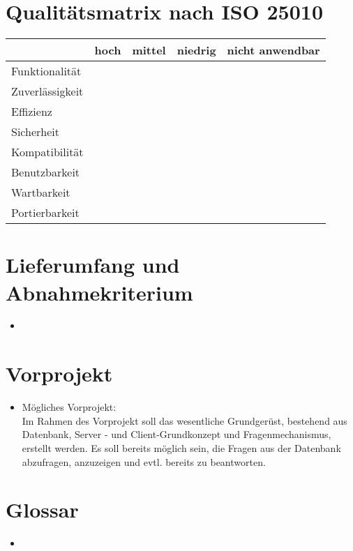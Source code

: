 \documentclass[11pt,a4paper]{scrreprt}
\begin{document}
\chapter{Qualitätsmatrix nach ISO 25010}
\begin{tabular}{|l|c|c|c|c|}
\hline
		& hoch & mittel & niedrig& nicht anwendbar\\
\hline
Funktionalität  &              &              & 		&\\     
Zuverlässigkeit	&              &              & 		&\\
Effizienz 		&              &              & 		&\\
Sicherheit  	&              &              & 		&\\
Kompatibilität  &              &              & 		&\\
Benutzbarkeit  	&              &              & 		&\\
Wartbarkeit  	&              &              & 		&\\
Portierbarkeit  &              &              & 		&\\
\hline
\end{tabular}

\chapter{Lieferumfang und Abnahmekriterium}
\begin{itemize}
\item
\end{itemize}

\chapter{Vorprojekt}
\begin{itemize}
\item Mögliches Vorprojekt: \\
Im Rahmen des Vorprojekt soll das wesentliche Grundgerüst, bestehend aus Datenbank, Server - und Client-Grundkonzept und Fragenmechanismus, erstellt werden. Es soll bereits möglich sein, die Fragen aus der Datenbank abzufragen, anzuzeigen und evtl. bereits zu beantworten.
\end{itemize}

\chapter{Glossar}
\begin{itemize}
\item
\end{itemize}
\end{document}
